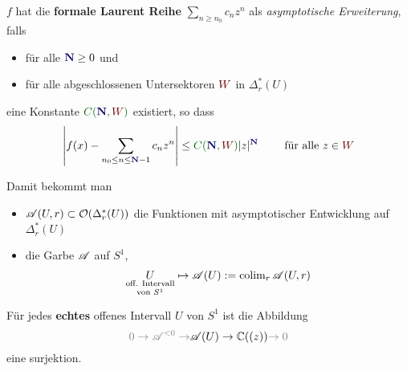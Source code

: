 \begin{defn}
  \def\myN{\textbf{\textcolor{blue!40!black}{N}}}
  \def\mySect{\textcolor{red!40!black}{W}}
  \def\myConst{\textcolor{green!40!black}{C(\myN,\mySect)}}
  $f$ hat die \textbf{formale Laurent Reihe} $\sum_{n\geq n_0}c_nz^n$ als
  \emph{asymptotische Erweiterung}, falls
  \begin{itemize}
    \item für alle $\myN\geq0$ und
    \item für alle abgeschlossenen Untersektoren $\mySect$ in $\Delta_r^*(U)$
  \end{itemize}
  eine Konstante $\myConst$ existiert, so dass
  \[
    \left|
      f(x)-\sum_{n_0\leq n\leq\myN-1}c_nz^n
    \right|
    \leq \myConst|z|^{\myN} \qquad \text{ für alle } z\in \mySect
  \]
  \begin{comment}
    oder äquivalent
    \[
      \lim_{z\to0,z\in{\mySect}}
      |z|^{-(\myN-1)}
      \left|
        f(x)-\sum_{n_0\leq n\leq \myN-1}c_nz^n
      \right|=0
    \]
  \end{comment}
  Damit bekommt man
  \begin{itemize}
    \item $\mathscr{A}(U,r)\subset\mathcal{O}(\Delta_r^*(U))$ die Funktionen mit asymptotischer
      Entwicklung auf $\Delta_r^*(U)$
    \item die Garbe $\mathscr{A}$ auf $S^1$,
      \[
        \underset{\text{von } S^1}{\underset{\text{off. Intervall}}{U}}
        \mapsto\mathscr{A}(U):=\operatorname{colim}_r\mathscr{A}(U,r)
      \]
  \end{itemize}
\end{defn}
\begin{lem}
  Für jedes \textbf{echtes} offenes Intervall $U$ von $S^1$ ist die Abbildung
  \[
    \textcolor{gray}{0\to \sA^{<0} \to}
    \sA(U)\to \C((z))
    \textcolor{gray}{\to0}
  \]
  eine surjektion.
\end{lem}
